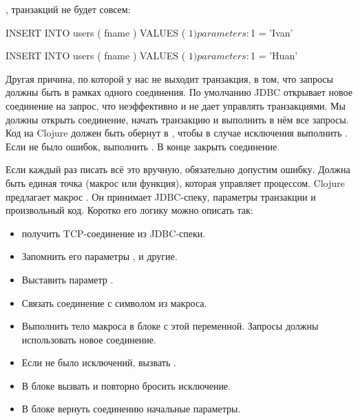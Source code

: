 , транзакций не будет совсем:

\begin{english}
  \begin{sql}
INSERT INTO users ( fname ) VALUES ( $1 )
parameters: $1 = 'Ivan'

INSERT INTO users ( fname ) VALUES ( $1 )
parameters: $1 = 'Huan'
  \end{sql}
\end{english}

Другая причина, по которой у нас не выходит транзакция, в том, что запросы должны быть в рамках одного соединения. По умолчанию JDBC открывает новое соединение на запрос, что неэффективно и не дает управлять транзакциями. Мы должны открыть соединение, начать транзакцию и выполнить в нём все запросы. Код на Clojure должен быть обернут в , чтобы в случае исключения выполнить . Если не было ошибок, выполнить . В конце закрыть соединение.

Если каждый раз писать всё это вручную, обязательно допустим ошибку. Должна быть единая точка (макрос или функция), которая управляет процессом. Clojure предлагает макрос . Он принимает JDBC-спеку, параметры транзакции и произвольный код. Коротко его логику можно описать так:

\begin{itemize}

\item
  получить TCP-соединение из JDBC-спеки.

\item
  Запомнить его параметры ,  и другие.

\item
  Выставить параметр .

\item
  Связать соединение с символом из макроса.

\item
  Выполнить тело макроса в блоке  с этой переменной. Запросы должны использовать новое соединение.

\item
  Если не было исключений, вызвать .

\item
  В блоке  вызвать  и повторно бросить исключение.

\item
  В блоке  вернуть соединению начальные параметры.

\end{itemize}

